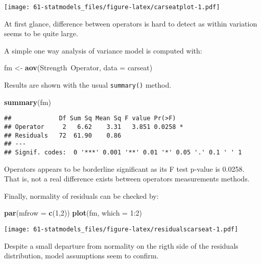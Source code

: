 \documentclass[]{book}
\newenvironment{Shaded}{\begin{snugshade}}{\end{snugshade}}
\newcommand{\KeywordTok}[1]{\textcolor[rgb]{0.13,0.29,0.53}{\textbf{{#1}}}}
\newcommand{\DataTypeTok}[1]{\textcolor[rgb]{0.13,0.29,0.53}{{#1}}}
\newcommand{\DecValTok}[1]{\textcolor[rgb]{0.00,0.00,0.81}{{#1}}}
\newcommand{\StringTok}[1]{\textcolor[rgb]{0.31,0.60,0.02}{{#1}}}
\newcommand{\NormalTok}[1]{{#1}}
\begin{document}
\texttt{[image: 61-statmodels\_files/figure-latex/carseatplot-1.pdf]}

At first glance, difference between operators is hard to detect as
within variation seems to be quite large.

A simple one way analysis of variance model is computed with:

\begin{Shaded}
\begin{Highlighting}[]
\NormalTok{fm <-}\StringTok{ }\KeywordTok{aov}\NormalTok{(Strength~Operator, }\DataTypeTok{data =} \NormalTok{carseat)}
\end{Highlighting}
\end{Shaded}

Results are shown with the usual \texttt{summary()} method.

\begin{Shaded}
\begin{Highlighting}[]
\KeywordTok{summary}\NormalTok{(fm)}
\end{Highlighting}
\end{Shaded}

\begin{verbatim}
##             Df Sum Sq Mean Sq F value Pr(>F)  
## Operator     2   6.62    3.31   3.851 0.0258 *
## Residuals   72  61.90    0.86                 
## ---
## Signif. codes:  0 '***' 0.001 '**' 0.01 '*' 0.05 '.' 0.1 ' ' 1
\end{verbatim}

Operators appears to be borderline significant as its F test p-value is
0.0258. That is, not a real difference exists between operators
measurements methods.

Finally, normality of residuals can be checked by:

\begin{Shaded}
\begin{Highlighting}[]
\KeywordTok{par}\NormalTok{(}\DataTypeTok{mfrow =} \KeywordTok{c}\NormalTok{(}\DecValTok{1}\NormalTok{,}\DecValTok{2}\NormalTok{))}
\KeywordTok{plot}\NormalTok{(fm, }\DataTypeTok{which =} \DecValTok{1}\NormalTok{:}\DecValTok{2}\NormalTok{)}
\end{Highlighting}
\end{Shaded}

\texttt{[image: 61-statmodels\_files/figure-latex/residualscarseat-1.pdf]}

Despite a small departure from normality on the rigth side of the
residuals distribution, model assumptions seem to confirm.
\end{document}
